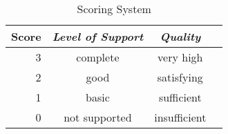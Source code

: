 \begin{table}
\caption{Scoring System}
\label{tab:scoring}
\centering
\setlength{\tabcolsep}{5mm} %
\def\arraystretch{1.25} %
\begin{tabular}{|r||c|c|c|} \hline
Score & \emph{Level of Support} & \emph{Quality}\\
\hline\hline
3 & complete & very high \\
\hline
2 & good & satisfying \\
\hline
1 & basic & sufficient \\
\hline
0 & not supported & insufficient \\
\hline
\end{tabular}
\end{table}


% 




